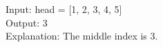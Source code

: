 \documentclass[preview]{standalone}
\begin{document}
Input: head = [1, 2, 3, 4, 5]\\Output: 3\\Explanation: The middle index is 3.\\
\end{document}
